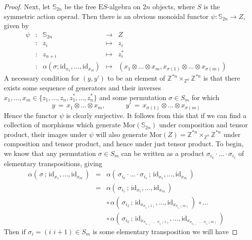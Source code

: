 \documentclass{amsbook} %
\numberwithin{section}{chapter}
\begin{document}
\begin{proof}
Next, let $\mathbb{S}_{2n}$ be the free $\mathrm{E}S$-algebra on $2n$ objects, where $S$ is the symmetric action operad. Then there is an obvious monoidal functor $\psi : \mathbb{S}_{2n} \to Z$, given by
\[ \begin{array}{rcrcl}
			\psi & : & \mathbb{S}_{2n} & \to & Z \\
			 & : & z_i & \mapsto & z_i \\
			 & : & z_{n+i} & \mapsto & z_i^* \\
			 & : & \alpha(\sigma; \mathrm{id}_{x_1}, ..., \mathrm{id}_{x_m}) & \mapsto & (x_1 \otimes ... \otimes x_m, x_{\sigma(1)} \otimes ... \otimes x_{\sigma(m)})
		\end{array}
\]
A necessary condition for $(y, y')$ to be an element of $\mathbb{Z}^{\ast n} \times_{\mathbb{Z}^n} \mathbb{Z}^{\ast n}$ is that there exists some sequence of generators and their inverses $x_1, ..., x_m \in \{z_1, ..., z_n, z_1^*, ..., z_n^*\}$ and some permutation $\sigma \in S_m$ for which
\[ y \, = \, x_1 \otimes ... \otimes x_m, \quad \quad \quad y' \, = \, x_{\sigma(1)} \otimes ... \otimes x_{\sigma(m)} \]
Hence the functor $\psi$ is clearly surjective. It follows from this that if we can find a collection of morphisms which generate $\mathrm{Mor}(\mathbb{S}_{2n})$ under composition and tensor product, their images under $\psi$ will also generate $\mathrm{Mor}(Z) = \mathbb{Z}^{\ast n} \times_{\mathbb{Z}^n} \mathbb{Z}^{\ast n}$ under composition and tensor product, and hence under just tensor product. To begin, we know that any permutation $\sigma \in S_m$ can be written as a product $\sigma_{i_k} \cdot ... \cdot \sigma_{i_1}$ of elementary transpositions, giving
\[ \begin{array}{rlll}
			\alpha( \, \sigma \, ; \, \mathrm{id}_{x_1}, ..., \mathrm{id}_{x_m} \, ) & = & \alpha( \, \sigma_{i_k} \cdot ... \cdot \sigma_{i_1} \, ; \,  \mathrm{id}_{x_1}, ..., \mathrm{id}_{x_m} \, ) \\
			& = &  \alpha( \, \sigma_{i_1} \, ; \,  \mathrm{id}_{x_1}, ..., \mathrm{id}_{x_m} \, )  \\
			& & \circ \, \alpha( \, \sigma_{i_2} \, ; \,  \mathrm{id}_{x_{\sigma_{i_1}(1)}}, ..., \mathrm{id}_{x_{\sigma_{i_1}(m)}} \, ) \, \circ ... \\
			& & \circ \, \alpha( \, \sigma_{i_k} \, ; \,  \mathrm{id}_{x_{\sigma_{i_{k-1}} \cdot ... \cdot \sigma_{i_1}(1)}}, ..., \mathrm{id}_{x_{\sigma_{i_{k-1}} \cdot ... \cdot \sigma_{i_1}(m)}} \, )
		\end{array}
\]
Then if $\sigma_i = (i \, \, i+1) \in S_m$ is some elementary transposition we will have

\end{proof}
\end{document}
